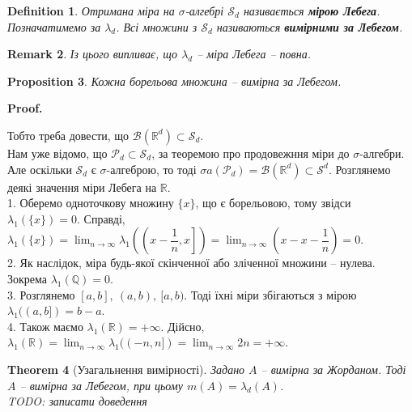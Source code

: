 \documentclass[a4paper, 10pt]{article}
\makeatletter
\theoremstyle{theoremdd}
\newtheorem{theorem}{Theorem}[subsection]
\newtheorem{definition}[theorem]{Definition}
\newtheorem{proposition}[theorem]{Proposition}
\newtheorem{remark}[theorem]{Remark}
\renewenvironment{proof}[1][Proof.\\]{\par
\pushQED{\hfill \qed}%
\normalfont \topsep6\p@\@plus6\p@\relax
\trivlist
\item\relax
{\bfseries
#1\@addpunct{.}}\hspace\labelsep\ignorespaces
}{%
\popQED\endtrivlist\@endpefalse
}
\makeatother
\begin{document}
\begin{definition}
Отримана міра на $\sigma$-алгебрі $\mathcal{S}_d$ називається \textbf{мірою Лебега}. Позначатимемо за $\lambda_d$. Всі множини з $\mathcal{S}_d$ називаються \textbf{вимірними за Лебегом}.
\end{definition}

\begin{remark}
Із цього випливає, що $\lambda_d$ -- міра Лебега -- повна.
\end{remark}

\begin{proposition}
Кожна борельова множина -- вимірна за Лебегом.
\end{proposition}

\begin{proof}
Тобто треба довести, що $\mathcal{B}(\mathbb{R}^d) \subset \mathcal{S}_d$.\\
Нам уже відомо, що $\mathcal{P}_d \subset \mathcal{S}_d$, за теоремою про продовежння міри до $\sigma$-алгебри. Але оскільки $\mathcal{S}_d$ є $\sigma$-алгеброю, то тоді $\sigma a(\mathcal{P}_d) = \mathcal{B}(\mathbb{R}^d) \subset \mathcal{S}^d$.
\end{proof}
\noindent
Розглянемо деякі значення міри Лебега на $\mathbb{R}$.\\
1. Оберемо одноточкову множину $\{x\}$, що є борельовою, тому звідси $\lambda_1(\{x\}) =0$. Справді,\\
$\lambda_1(\{x\}) = \displaystyle\lim_{n \to \infty} \lambda_1\left( \left( x-\dfrac{1}{n},x \right]\right) = \lim_{n \to \infty} \left( x - x-\dfrac{1}{n} \right) = 0$.
\bigskip \\
2. Як наслідок, міра будь-якої скінченної або зліченної множини -- нулева. Зокрема $\lambda_1(\mathbb{Q}) = 0$.
\bigskip \\
3. Розглянемо $[a,b],\ (a,b),\ [a,b)$. Тоді їхні міри збігаються з мірою $\lambda_1((a,b]) = b-a$.
\bigskip \\
4. Також маємо $\lambda_1(\mathbb{R}) = +\infty$. Дійсно,\\
$\displaystyle\lambda_1(\mathbb{R}) = \lim_{n \to \infty} \lambda_1((-n,n]) = \lim_{n \to \infty} 2n = +\infty$.

\begin{theorem}[Узагальнення вимірності]
Задано $A$ -- вимірна за Жорданом. Тоді $A$ -- вимірна за Лебегом, при цьому $m(A) = \lambda_d(A)$.\\
\textit{TODO: записати доведення}
\end{theorem}
\end{document}
